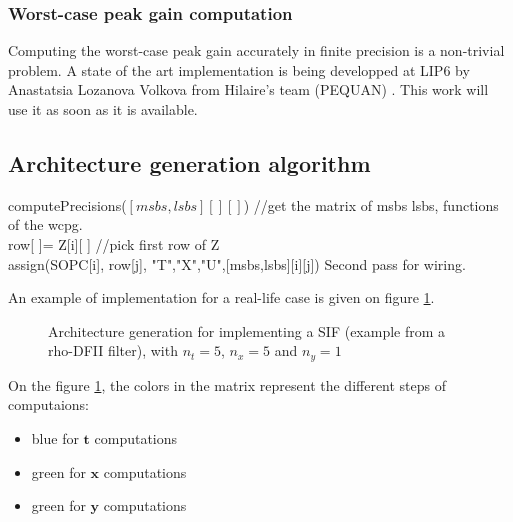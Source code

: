 		\subsubsection{Worst-case peak gain computation}
			Computing the worst-case peak gain accurately in finite precision is a non-trivial problem.
			A state of the art implementation is being developped at LIP6 by Anastatsia Lozanova Volkova from Hilaire's team (PEQUAN) \cite{Volk15a}.
			This work will use it as soon as it is available.


\subsection{Architecture generation algorithm}

	\begin{algorithm}[H]
	computePrecisions($[msbs,lsbs][][]$) //get the matrix of msbs lsbs, functions of the wcpg. \\
	 {
	 	row[ ]= Z[i][ ] //pick first row of Z \\
	 	 {
	 		assign(SOPC[i], row[j], {"T","X","U"},[msbs,lsbs][i][j])
	 	}
		Second pass for wiring.
	}
	\end{algorithm}

	An example of implementation for a real-life case is given on figure \ref{fig:SIFimpl}.

	\begin{figure}[!h]
	\begin{center}
	\scalebox{6.5}{}
	\end{center}
	\caption{ Architecture generation for implementing a SIF (example from a rho-DFII filter), with $n_t=5$, $n_x=5$ and $n_y=1$ \label{fig:SIFimpl}}
	\end{figure}

	On the figure \ref{fig:SIFimpl}, the colors in the matrix represent the different steps of computaions:
	\begin{itemize}
		\item blue for $\boldsymbol{t}$ computations
		\item green for $\boldsymbol{x}$ computations
		\item green for $\boldsymbol{y}$ computations
	\end{itemize}

